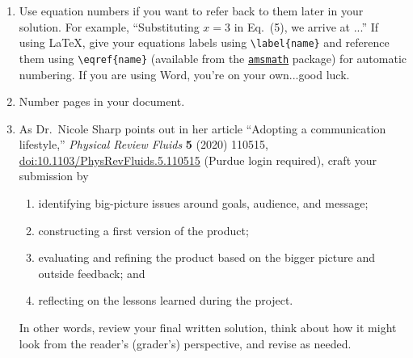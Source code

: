 \documentclass[11pt]{article}
\begin{document}
\begin{enumerate}
\begin{enumerate}
\begin{enumerate}
    		\item[\faLightbulb] Note that in \LaTeX\ left quotes are \verb+`+ (or coded as \verb+\lq+), which is a different key than \verb+'+. To get double quotation marks, press \verb+`+ twice, \verb+``+. To close the quote, press \verb+'+ twice, \verb+''+.

			\item[\faLightbulb] Also note that \LaTeX\ assumes periods denote the end of a sentence, which requires extra space after the period. However, we often use periods in the middle of a sentence, in constructions such as ``Eq.'' or ``et al.'' To ensure proper spacing, code these expressions as ``\verb+Eq.\+'' or ``\verb+et al.\+'' the backslash after the period tells \LaTeX\ that this period is not the end of a sentence.
		\end{enumerate}

	\end{enumerate}

	\item Use equation numbers if you want to refer back to them later in your solution. For example, ``Substituting $x=3$ in Eq.~(5), we arrive at ...'' If using \LaTeX, give your equations labels using \verb+\label{name}+ and reference them using \verb+\eqref{name}+ (available from the \href{https://ctan.org/pkg/amsmath}{\texttt{amsmath}} package) for automatic numbering. If you are using Word, you're on your own...good luck. \Smiley

	\item Number pages in your document.

	\item As Dr.\ Nicole Sharp points out in her article ``Adopting a communication lifestyle,'' \textit{Physical Review Fluids} \textbf{5} (2020) 110515, \href{https://journals-aps-org.ezproxy.lib.purdue.edu/prfluids/abstract/10.1103/PhysRevFluids.5.110515}{doi:10.1103/PhysRevFluids.5.110515} (Purdue login required), craft your submission by
	\begin{enumerate}
		\item identifying big-picture issues around goals, audience, and message;
		\item constructing a first version of the product;
		\item evaluating and refining the product based on the bigger picture and outside feedback; and
		\item reflecting on the lessons learned during the project.
	\end{enumerate}
	In other words, review your final written solution, think about how it might look from the reader's (grader's) perspective, and revise as needed.


\end{enumerate}
\end{document}
